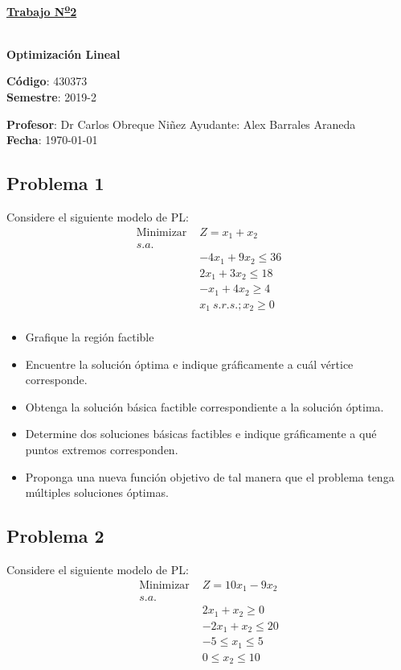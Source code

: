 \documentclass[letterpaper]{article}
\begin{document}
\vspace*{0.5\baselineskip}
\begin{center}
\begin{Large}
\textbf{\underline{Trabajo N\textsuperscript{\underline{o}}2}}
\end{Large}\\
\vspace*{0.5\baselineskip}
\textbf{Optimización Lineal} \\
\vspace*{0.5\baselineskip}
\begin{footnotesize}
\textbf{Código}: 430373\\
\textbf{Semestre}: 2019-2
\end{footnotesize}
\end{center}

\noindent \textbf{Profesor}: Dr Carlos Obreque Niñez  \hfill Ayudante: Alex Barrales Araneda\\
\noindent \textbf{Fecha}: \today

\subsection*{Problema 1}
Considere el siguiente modelo de PL:
\begin{align*}
\mbox{Minimizar }&Z = x_1 + x_2 \\
s.a.\\
&-4x_1 + 9x_2 \leq 36\\
&2x_1 + 3x_2 \leq 18\\
&-x_1 + 4x_2  \geq 4\\
&x_1 \: s.r.s.;x_2 \geq 0\\
\end{align*}

\begin{itemize}
\item Grafique la región factible
\item Encuentre la solución óptima e indique gráficamente a cuál vértice corresponde.
\item Obtenga la solución básica factible correspondiente a la solución óptima.
\item Determine dos soluciones básicas factibles e indique gráficamente a qué puntos extremos corresponden.
\item Proponga una nueva función objetivo de tal manera que el problema tenga múltiples soluciones óptimas. 
\end{itemize}

\subsection*{Problema 2}
Considere el siguiente modelo de PL:
\begin{align*}
\mbox{Minimizar }&Z = 10x_1 - 9x_2 \\
s.a.\\
&2x_1 + x_2 \geq 0\\
&-2x_1 + x_2 \leq 20\\
&-5 \leq x_1 \leq 5\\
&0 \leq x_2 \leq 10\\
\end{align*}
\end{document}

